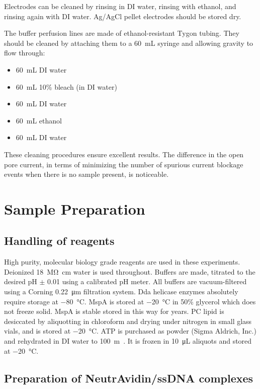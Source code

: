 Electrodes can be cleaned by rinsing in DI water, rinsing with ethanol, and rinsing again with DI water.  Ag/AgCl pellet electrodes should be stored dry.

The buffer perfusion lines are made of ethanol-resistant Tygon tubing.  They should be cleaned by attaching them to a \SI{60}{\mL} syringe and allowing gravity to flow through:

\begin{itemize}
\item \SI{60}{\mL} DI water
\item \SI{60}{\mL} \num{10}\% bleach (in DI water)
\item \SI{60}{\mL} DI water
\item \SI{60}{\mL} ethanol
\item \SI{60}{\mL} DI water
\end{itemize}

These cleaning procedures ensure excellent results.  The difference in the open pore current, in terms of minimizing the number of spurious current blockage events when there is no sample present, is noticeable.

\section{Sample Preparation}
\label{sample_prep}

\subsection{Handling of reagents}

High purity, molecular biology grade reagents are used in these experiments.  Deionized \SI{18}{\mega\ohm\cm} water is used throughout.  Buffers are made, titrated to the desired pH $\pm$ \num{0.01} using a calibrated pH meter.  All buffers are vacuum-filtered using a Corning \SI{0.22}{\micro\m} filtration system.  Dda helicase enzymes absolutely require storage at \SI{-80}{\celsius}.  MspA is stored at \SI{-20}{\celsius} in \num{50}\% glycerol which does not freeze solid.  MspA is stable stored in this way for years.  PC lipid is desiccated by aliquotting in chloroform and drying under nitrogen in small glass vials, and is stored at \SI{-20}{\celsius}.  ATP is purchased as powder (Sigma Aldrich, Inc.) and rehydrated in DI water to \SI{100}{\m\Molar}.  It is frozen in \SI{10}{\micro\liter} aliquots and stored at \SI{-20}{\celsius}.

\subsection{Preparation of NeutrAvidin/ssDNA complexes}

